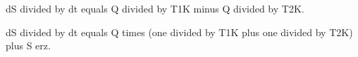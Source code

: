 dS divided by dt equals Q divided by T1K minus Q divided by T2K.  

dS divided by dt equals Q times (one divided by T1K plus one divided by T2K) plus S erz.